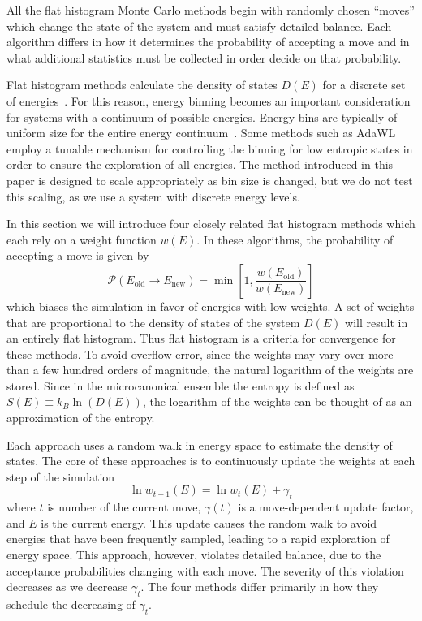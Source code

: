 \documentclass[letterpaper,twocolumn,amsmath,amssymb,pre,aps,10pt]{revtex4-1}
\begin{document}
All the flat histogram Monte Carlo methods begin with randomly chosen
``moves'' which change the state of the system and must satisfy
detailed balance.  Each algorithm differs in how it determines the
probability of accepting a move and in what additional statistics must
be collected in order decide on that probability.

Flat histogram methods calculate the density of states $D(E)$ for a
discrete set of energies~\cite{haber2018performance}. For this reason,
energy binning becomes an important consideration for systems with a
continuum of possible energies.  Energy bins are typically of uniform
size for the entire energy continuum~\cite{fasnacht2004adaptive}. Some
methods such as AdaWL~\cite{koh2013dynamically} employ a tunable
mechanism for controlling the binning for low entropic states in order
to ensure the exploration of all energies.  The method introduced in
this paper is designed to scale appropriately as bin size is changed,
but we do not test this scaling, as we use a system with discrete
energy levels.

In this section we will introduce four closely related flat histogram
methods which each rely on a weight function $w(E)$.  In these
algorithms, the probability of accepting a move is given by
\begin{equation}
	\mathcal{P}(E_\text{old} \rightarrow E_\text{new})
	= \min\left[1,\frac{w(E_\text{old})}{w(E_\text{new})}\right]
\end{equation}
which biases the simulation in favor of energies with low weights.  A
set of weights that are proportional to the density of states of the
system $D(E)$ will result in an entirely flat histogram.  Thus flat
histogram is a criteria for convergence for these methods.  To avoid
overflow error, since the weights may vary over more than a few
hundred orders of magnitude, the natural logarithm of the weights are
stored.  Since in the microcanonical ensemble the entropy is defined
as $S(E) \equiv k_B\ln(D(E))$, the logarithm of the weights can be
thought of as an approximation of the entropy.

Each approach uses a random walk in energy space to
estimate the density of states.  The core of these approaches
is to continuously update the weights at each step of the simulation
\begin{equation}
	\ln{w_{t+1}(E)}=\ln{w_{t}(E)}
	+\gamma_t
\end{equation}
where $t$ is number of the current move, $\gamma(t)$ is a
move-dependent update factor, and $E$ is the current energy.  This
update causes the random walk to avoid energies that have been
frequently sampled, leading to a rapid exploration of energy space.
This approach, however, violates detailed balance, due to the
acceptance probabilities changing with each move.  The severity of
this violation decreases as we decrease $\gamma_t$.  The four methods
differ primarily in how they schedule the decreasing of $\gamma_t$.
\end{document}
